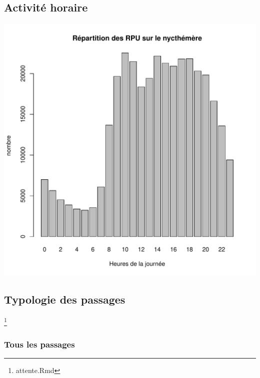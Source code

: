 \documentclass[12pt,english,french,twoside]{book}\usepackage[]{graphicx}\usepackage[]{color}
\makeatletter
\def\maxwidth{ %
  \ifdim\Gin@nat@width>\linewidth
    \linewidth
  \else
    \Gin@nat@width
  \fi
}
\newenvironment{knitrout}{}{} %
\makeatother
\begin{document}
\subsection*{Activité horaire}
\begin{knitrout}
\color{fgcolor}
\includegraphics[width=\maxwidth]{figure/activite_heure} 

\end{knitrout}


\subsection{Typologie des passages} \footnote{attente.Rmd}


\subsubsection*{Tous les passages}
\end{document}
